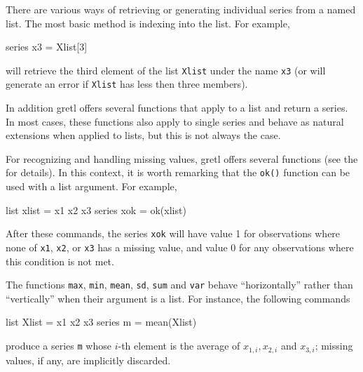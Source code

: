 There are various ways of retrieving or generating individual series
from a named list. The most basic method is indexing into the
list. For example,
%
\begin{code}
series x3 = Xlist[3]
\end{code}
%
will retrieve the third element of the list \texttt{Xlist} under the
name \texttt{x3} (or will generate an error if \texttt{Xlist} has less
then three members).

In addition gretl offers several functions that apply to a list and
return a series.  In most cases, these functions also apply to single
series and behave as natural extensions when applied to lists, but
this is not always the case.

For recognizing and handling missing values, gretl offers
several functions (see the \GCR{} for details). In this context, it is
worth remarking that the \texttt{ok()} function can be used with a
list argument.  For example,
%
\begin{code}
list xlist = x1 x2 x3
series xok = ok(xlist)
\end{code}
%
After these commands, the series \texttt{xok} will have value 1 for
observations where none of \texttt{x1}, \texttt{x2}, or
\texttt{x3} has a missing value, and value 0 for any observations
where this condition is not met.

The functions \texttt{max}, \texttt{min}, \texttt{mean}, \texttt{sd},
\texttt{sum} and \texttt{var} behave ``horizontally'' rather than
``vertically'' when their argument is a list. For instance, the
following commands
\begin{code}
  list Xlist = x1 x2 x3
  series m = mean(Xlist)
\end{code}
produce a series \texttt{m} whose $i$-th element is the average of
$x_{1,i}, x_{2,i}$ and $x_{3,i}$; missing values, if any, are implicitly discarded.

